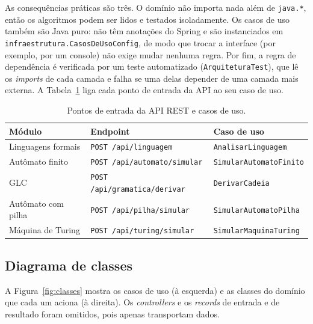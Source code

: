 \documentclass[12pt,a4paper]{article}
\newcommand{\cod}[1]{\texttt{#1}}
\begin{document}
As consequências práticas são três. O domínio não importa nada além de
\cod{java.*}, então os algoritmos podem ser lidos e testados isoladamente. Os
casos de uso também são Java puro: não têm anotações do Spring e são
instanciados em \cod{infraestrutura.CasosDeUsoConfig}, de modo que trocar a
interface (por exemplo, por um console) não exige mudar nenhuma regra. Por fim,
a regra de dependência é verificada por um teste automatizado
(\cod{ArquiteturaTest}), que lê os \textit{imports} de cada camada e falha se
uma delas depender de uma camada mais externa. A Tabela~\ref{tab:endpoints}
liga cada ponto de entrada da API ao seu caso de uso.

\begin{table}[htbp]
  \centering
  \caption{Pontos de entrada da API REST e casos de uso.}
  \label{tab:endpoints}
  \small
  \begin{tabular}{lll}
    \toprule
    Módulo & Endpoint & Caso de uso \\
    \midrule
    Linguagens formais & \cod{POST /api/linguagem} & \cod{AnalisarLinguagem} \\
    Autômato finito    & \cod{POST /api/automato/simular} & \cod{SimularAutomatoFinito} \\
    GLC                & \cod{POST /api/gramatica/derivar} & \cod{DerivarCadeia} \\
    Autômato com pilha & \cod{POST /api/pilha/simular} & \cod{SimularAutomatoPilha} \\
    Máquina de Turing  & \cod{POST /api/turing/simular} & \cod{SimularMaquinaTuring} \\
    \bottomrule
  \end{tabular}
\end{table}


\subsection{Diagrama de classes}

A Figura~\ref{fig:classes} mostra os casos de uso (à esquerda) e as classes do
domínio que cada um aciona (à direita). Os \emph{controllers} e os
\emph{records} de entrada e de resultado foram omitidos, pois apenas
transportam dados.
\end{document}
